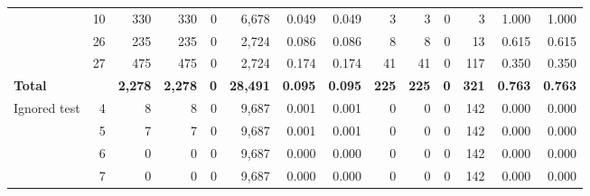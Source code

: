 \begin{xltabular}{\linewidth}{l r r r r r r r r r r r r r}
     & \textcolor{muted}{10} & \textcolor{muted}{330} & \textcolor{muted}{330} & \textcolor{muted}{0} & \textcolor{muted}{6,678} & \textcolor{muted}{0.049} & \textcolor{muted}{0.049} & \textcolor{muted}{3} & \textcolor{muted}{3} & \textcolor{muted}{0} & \textcolor{muted}{3} & \textcolor{muted}{1.000} & \textcolor{muted}{1.000} \\
     & \textcolor{muted}{26} & \textcolor{muted}{235} & \textcolor{muted}{235} & \textcolor{muted}{0} & \textcolor{muted}{2,724} & \textcolor{muted}{0.086} & \textcolor{muted}{0.086} & \textcolor{muted}{8} & \textcolor{muted}{8} & \textcolor{muted}{0} & \textcolor{muted}{13} & \textcolor{muted}{0.615} & \textcolor{muted}{0.615} \\
     & \textcolor{muted}{27} & \textcolor{muted}{475} & \textcolor{muted}{475} & \textcolor{muted}{0} & \textcolor{muted}{2,724} & \textcolor{muted}{0.174} & \textcolor{muted}{0.174} & \textcolor{muted}{41} & \textcolor{muted}{41} & \textcolor{muted}{0} & \textcolor{muted}{117} & \textcolor{muted}{0.350} & \textcolor{muted}{0.350} \\
    \textbf{Total} & & \textbf{2,278} & \textbf{2,278} & \textbf{0} & \textbf{28,491} & \textbf{0.095} & \textbf{0.095} & \textbf{225} & \textbf{225} & \textbf{0} & \textbf{321} & \textbf{0.763} & \textbf{0.763} \\
  \midrule
    \textcolor{muted}{Ignored test} & \textcolor{muted}{4} & \textcolor{muted}{8} & \textcolor{muted}{8} & \textcolor{muted}{0} & \textcolor{muted}{9,687} & \textcolor{muted}{0.001} & \textcolor{muted}{0.001} & \textcolor{muted}{0} & \textcolor{muted}{0} & \textcolor{muted}{0} & \textcolor{muted}{142} & \textcolor{muted}{0.000} & \textcolor{muted}{0.000} \\
     & \textcolor{muted}{5} & \textcolor{muted}{7} & \textcolor{muted}{7} & \textcolor{muted}{0} & \textcolor{muted}{9,687} & \textcolor{muted}{0.001} & \textcolor{muted}{0.001} & \textcolor{muted}{0} & \textcolor{muted}{0} & \textcolor{muted}{0} & \textcolor{muted}{142} & \textcolor{muted}{0.000} & \textcolor{muted}{0.000} \\
     & \textcolor{muted}{6} & \textcolor{muted}{0} & \textcolor{muted}{0} & \textcolor{muted}{0} & \textcolor{muted}{9,687} & \textcolor{muted}{0.000} & \textcolor{muted}{0.000} & \textcolor{muted}{0} & \textcolor{muted}{0} & \textcolor{muted}{0} & \textcolor{muted}{142} & \textcolor{muted}{0.000} & \textcolor{muted}{0.000} \\
     & \textcolor{muted}{7} & \textcolor{muted}{0} & \textcolor{muted}{0} & \textcolor{muted}{0} & \textcolor{muted}{9,687} & \textcolor{muted}{0.000} & \textcolor{muted}{0.000} & \textcolor{muted}{0} & \textcolor{muted}{0} & \textcolor{muted}{0} & \textcolor{muted}{142} & \textcolor{muted}{0.000} & \textcolor{muted}{0.000} \\

\end{xltabular}
